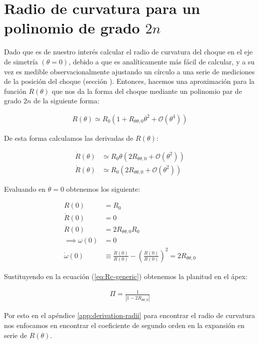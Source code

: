 \section{Radio de curvatura para un polinomio de grado $2n$}
\label{app:curvature-radius-poly}

Dado que es de nuestro interés calcular el radio de curvatura del choque en el eje de simetría
$(\theta=0)$, debido a que es analíticamente más fácil de calcular, y a su vez es medible
observacionalmente ajustando un círculo a una serie de mediciones de la posición del choque (sección ).
Entonces, hacemos una aproximación para la función $R(\theta)$ que nos da la forma del choque
mediante un polinomio par de grado $2n$ de la siguiente forma:

\begin{align}
R(\theta) \simeq R_0\left(1 + R_{\theta \theta, 0}\theta^2 + \mathcal{O}(\theta^4)\right)
\end{align}

De esta forma calculamos las derivadas de $R(\theta)$:

\begin{align}
  \dot{R}(\theta) &\simeq R_0\theta\left(2R_{\theta \theta, 0} + \mathcal{O}(\theta^2)\right) \\
  \ddot{R}(\theta) &\simeq R_0\left(2R_{\theta \theta, 0} + \mathcal{O}(\theta^2)\right)
\end{align}

Evaluando en $\theta = 0$ obtenemos los siguiente:

\begin{align}
  R(0) &= R_0 \\
  \dot{R}(0) &= 0 \\
  \ddot{R}(0) &= 2R_{\theta \theta, 0} R_0 \\
  \implies \omega(0) &= 0 \\
  \dot{\omega}(0) &\equiv \frac{\ddot{R}(0)}{R(0)} - \left(\frac{\dot{R}(0)}{R(0)}\right)^2 = 2R_{\theta \theta, 0}
\end{align}

Sustituyendo en la ecuación (\ref{eq:Rc-generic}) obtenemos la planitud en el ápex:

\begin{align}
  \Pi = \frac{1}{\left|1 - 2R_{\theta \theta, 0}\right|}\label{eq:Rc-nose}
\end{align}

Por esto en el apéndice \ref{app:derivation-radii} para encontrar el radio de curvatura nos enfocamos en encontrar
el coeficiente de segundo orden en la expansión en serie de $R(\theta)$.

